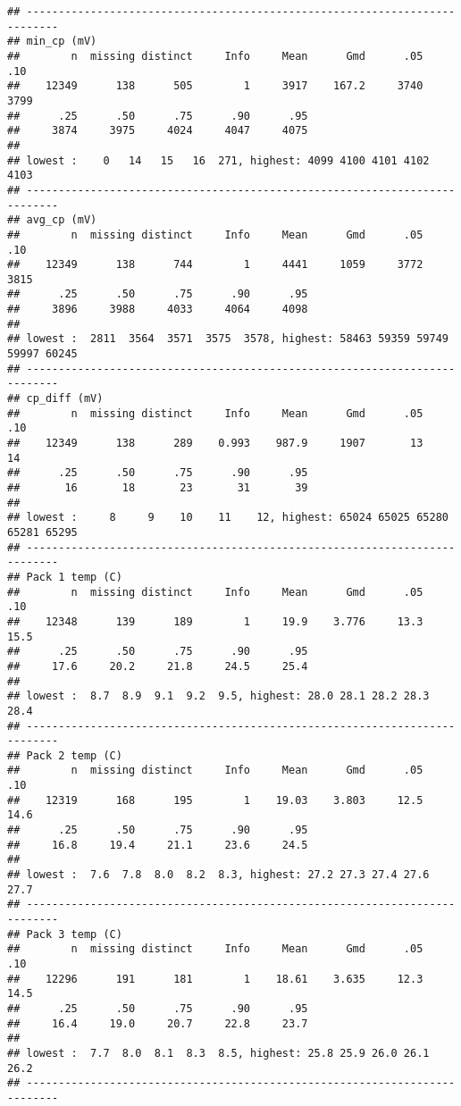 \documentclass[]{article}
\begin{document}
\begin{verbatim}
## ---------------------------------------------------------------------------
## min_cp (mV) 
##        n  missing distinct     Info     Mean      Gmd      .05      .10 
##    12349      138      505        1     3917    167.2     3740     3799 
##      .25      .50      .75      .90      .95 
##     3874     3975     4024     4047     4075 
## 
## lowest :    0   14   15   16  271, highest: 4099 4100 4101 4102 4103
## ---------------------------------------------------------------------------
## avg_cp (mV) 
##        n  missing distinct     Info     Mean      Gmd      .05      .10 
##    12349      138      744        1     4441     1059     3772     3815 
##      .25      .50      .75      .90      .95 
##     3896     3988     4033     4064     4098 
## 
## lowest :  2811  3564  3571  3575  3578, highest: 58463 59359 59749 59997 60245
## ---------------------------------------------------------------------------
## cp_diff (mV) 
##        n  missing distinct     Info     Mean      Gmd      .05      .10 
##    12349      138      289    0.993    987.9     1907       13       14 
##      .25      .50      .75      .90      .95 
##       16       18       23       31       39 
## 
## lowest :     8     9    10    11    12, highest: 65024 65025 65280 65281 65295
## ---------------------------------------------------------------------------
## Pack 1 temp (C) 
##        n  missing distinct     Info     Mean      Gmd      .05      .10 
##    12348      139      189        1     19.9    3.776     13.3     15.5 
##      .25      .50      .75      .90      .95 
##     17.6     20.2     21.8     24.5     25.4 
## 
## lowest :  8.7  8.9  9.1  9.2  9.5, highest: 28.0 28.1 28.2 28.3 28.4
## ---------------------------------------------------------------------------
## Pack 2 temp (C) 
##        n  missing distinct     Info     Mean      Gmd      .05      .10 
##    12319      168      195        1    19.03    3.803     12.5     14.6 
##      .25      .50      .75      .90      .95 
##     16.8     19.4     21.1     23.6     24.5 
## 
## lowest :  7.6  7.8  8.0  8.2  8.3, highest: 27.2 27.3 27.4 27.6 27.7
## ---------------------------------------------------------------------------
## Pack 3 temp (C) 
##        n  missing distinct     Info     Mean      Gmd      .05      .10 
##    12296      191      181        1    18.61    3.635     12.3     14.5 
##      .25      .50      .75      .90      .95 
##     16.4     19.0     20.7     22.8     23.7 
## 
## lowest :  7.7  8.0  8.1  8.3  8.5, highest: 25.8 25.9 26.0 26.1 26.2
## ---------------------------------------------------------------------------

\end{verbatim}
\end{document}
